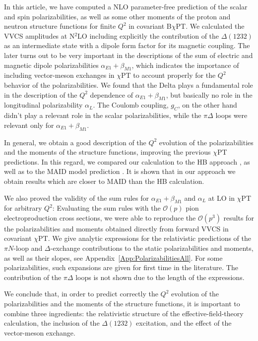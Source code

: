 \documentclass[11pt,preprint,tightenlines,
showpacs,preprintnumbers,amsmath,amssymb,superscriptaddress,a4paper,nofootinbib]{revtex4-1}
\begin{document}
In this article, we have computed a NLO parameter-free prediction of the scalar and spin polarizabilities, as well as some other moments of the proton and neutron structure functions for finite $Q^2$ in covariant B$\chi$PT. 
We calculated the VVCS amplitudes at N$^2$LO including explicitly the contribution of the $\Delta(1232)$ as an intermediate state with a dipole form factor for its magnetic coupling. The later turns out to be very important in the descriptions of the sum of electric and magnetic dipole polarizabilities $\alpha_{E1}+\beta_{M1}$, which indicates the importance of including vector-meson exchanges in $\chi$PT to account properly for the $Q^2$ behavior of the polarizabilities. We found that the Delta plays a fundamental role in the description of the $Q^2$ dependence of $\alpha_{E1}+\beta_{M1}$, but basically no role in the longitudinal polarizability $\alpha_L$. The Coulomb coupling, $g_C$, on the other hand didn't play a relevant role in the scalar polarizabilities, while the $\pi\Delta$ loops were relevant only for $\alpha_{E1}+\beta_{M1}$.

In general, we obtain a good description of the $Q^2$ evolution of the polarizabilities and the moments of the structure functions, improving the previous $\chi$PT predictions.
In this regard, we compared our calculation to the HB approach \cite{Nevado:2007dd}, as well as to the MAID model prediction \cite{MAID}. 
It is shown that in our approach we obtain results which are closer to  MAID than the HB calculation.

We also proved the validity of the sum rules for $\alpha_{E1}+\beta_{M1}$ and $\alpha_L$ at LO in $\chi$PT for arbitrary $Q^2$:
Evaluating the sum rules with the $\mathcal{O}(p)$  pion electroproduction cross sections, we were able to reproduce the $\mathcal{O}(p^3)$ results for the polarizabilities and moments obtained directly from forward VVCS in covariant $\chi$PT.
We give analytic expressions for the relativistic predictions of the $\pi N$-loop and $\Delta$-exchange contributions to the static polarizabilities and moments, as well as their slopes, see Appendix~\ref{App:PolarizabilitiesAll}.
For some polarizabilities, such expansions are given for first time in the literature. 
The contribution of the $\pi \Delta$ loops is not shown due to the length of the  expressions.

We conclude that, in order to predict correctly the $Q^2$ evolution of the polarizabilities and the moments of the structure functions, it is important to combine three ingredients: the relativistic structure of the effective-field-theory calculation, the inclusion of the $\Delta(1232)$ excitation, and the effect of the vector-meson exchange.
\end{document}
